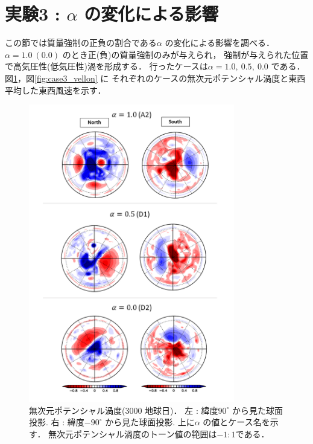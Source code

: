 \documentclass[a4j,12pt,openbib,oneside]{jreport}
\begin{document}
\section{実験3 : {$\alpha$} の変化による影響}
\label{sec:case3}
この節では質量強制の正負の割合である$\alpha$ の変化による影響を調べる．
$\alpha = 1.0 ~(0.0)$ のとき正(負)の質量強制のみが与えられ，
強制が与えられた位置で高気圧性(低気圧性)渦を形成する．
行ったケースは$\alpha = 1.0,~0.5,~0.0$ である．
図\ref{fig:case3_nonqv}，図\ref{fig:case3_vellon} に
それぞれのケースの無次元ポテンシャル渦度と東西平均した東西風速を示す．
%
%
%
%
\begin{figure}[ht]
  \begin{center}
    \includegraphics[clip,width=9cm]{./fig/result/case3/case3_nonqv.png}
    \caption{
      \footnotesize{無次元ポテンシャル渦度(3000 地球日)．
左 : 緯度$90^\circ$ から見た球面投影.
右 : 緯度$-90^\circ$ から見た球面投影.
上に$\alpha$ の値とケース名を示す．
無次元ポテンシャル渦度のトーン値の範囲は$-1:1$である．
      }
    }
    \label{fig:case3_nonqv}
  \end{center}
\end{figure}
\end{document}
